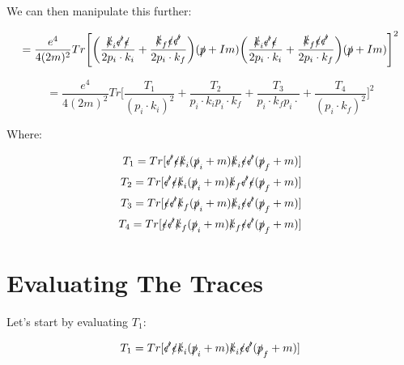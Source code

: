 \documentclass[a4]{article}
\begin{document}
    We can then manipulate this further:

    \begin{equation}
        = \frac{e^4}{4 (2m)^2} Tr \Bigg[ \bigg(\frac{\slashed{k}_i \slashed{\epsilon'} \slashed{\epsilon}}{2 p_i \cdot k_i} + \frac{\slashed{k}_f \slashed{\epsilon} \slashed{\epsilon'}}{2 p_i \cdot k_f} \bigg) (\slashed{p} + I m) \bigg(\frac{\slashed{k}_i \slashed{\epsilon'} \slashed{\epsilon}}{2 p_i \cdot k_i} + \frac{\slashed{k}_f \slashed{\epsilon} \slashed{\epsilon'}}{2 p_i \cdot k_f} \bigg) (\slashed{p} + I m) \Bigg]^2
    \end{equation}

    \begin{equation}
        = \frac{e^4}{4 (2m)^2} Tr \Bigg[ \frac{T_1}{(p_i \cdot k_i)^2} + \frac{T_2}{p_i \cdot k_i p_i \cdot k_f} + \frac{T_3}{p_i \cdot k_f p_i \cdot} + \frac{T_4}{(p_i \cdot k_f)^2} \Bigg]^2
    \end{equation}

    Where:

    \begin{equation}
        \begin{aligned}
            T_1 = Tr [\slashed{\epsilon'} \slashed{\epsilon} \slashed{k}_i (\slashed{p}_i + m) \slashed{k}_i \slashed{\epsilon} \slashed{\epsilon'} (\slashed{p}_f + m)] \\
            T_2 = Tr [\slashed{\epsilon'} \slashed{\epsilon} \slashed{k}_i (\slashed{p}_i + m) \slashed{k}_f \slashed{\epsilon'} \slashed{\epsilon} (\slashed{p}_f + m)] \\
            T_3 = Tr [\slashed{\epsilon} \slashed{\epsilon'} \slashed{k}_f (\slashed{p}_i + m) \slashed{k}_i \slashed{\epsilon} \slashed{\epsilon'} (\slashed{p}_f + m)] \\
            T_4 = Tr [\slashed{\epsilon} \slashed{\epsilon'} \slashed{k}_f (\slashed{p}_i + m) \slashed{k}_f \slashed{\epsilon} \slashed{\epsilon'} (\slashed{p}_f + m)] \\
        \end{aligned}
    \end{equation}

    \section*{Evaluating The Traces}

    Let's start by evaluating $T_1$:

    \begin{equation}
        T_1 = Tr [\slashed{\epsilon'} \slashed{\epsilon} \slashed{k}_i (\slashed{p}_i + m) \slashed{k}_i \slashed{\epsilon} \slashed{\epsilon'} (\slashed{p}_f + m)]
    \end{equation}
\end{document}

